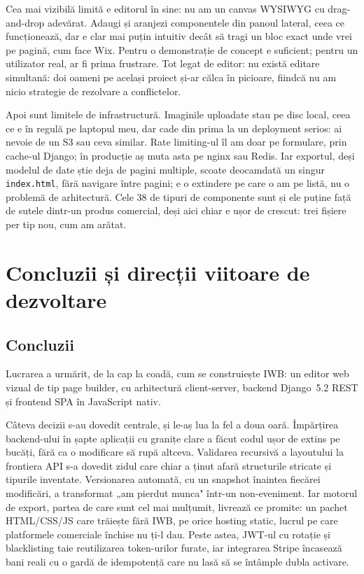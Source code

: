 \documentclass[12pt,a4paper]{report}
\begin{document}
Cea mai vizibilă limită e editorul în sine: nu am un canvas WYSIWYG cu drag-and-drop
adevărat. Adaugi și aranjezi componentele din panoul lateral, ceea ce funcționează, dar
e clar mai puțin intuitiv decât să tragi un bloc exact unde vrei pe pagină, cum face
Wix. Pentru o demonstrație de concept e suficient; pentru un utilizator real, ar fi
prima frustrare. Tot legat de editor: nu există editare simultană: doi oameni pe
același proiect și-ar călca în picioare, fiindcă nu am nicio strategie de rezolvare a
conflictelor.

Apoi sunt limitele de infrastructură. Imaginile uploadate stau pe disc local, ceea ce
e în regulă pe laptopul meu, dar cade din prima la un deployment serios: ai nevoie
de un S3 sau ceva similar. Rate limiting-ul îl am doar pe formulare, prin cache-ul
Django; în producție aș muta asta pe nginx sau Redis. Iar exportul, deși modelul de
date știe deja de pagini multiple, scoate deocamdată un singur \texttt{index.html}, fără
navigare între pagini; e o extindere pe care o am pe listă, nu o problemă de
arhitectură. Cele 38 de tipuri de componente sunt și ele puține față de sutele dintr-un
produs comercial, deși aici chiar e ușor de crescut: trei fișiere per tip nou, cum am
arătat.

\chapter{Concluzii și direcții viitoare de dezvoltare}

\section{Concluzii}

Lucrarea a urmărit, de la cap la coadă, cum se construiește IWB: un editor
web vizual de tip page builder, cu arhitectură client-server, backend Django~5.2 REST
și frontend SPA în JavaScript nativ.

Câteva decizii s-au dovedit centrale, și le-aș lua la fel a doua oară. Împărțirea
backend-ului în șapte aplicații cu granițe clare a făcut codul ușor de extins pe bucăți,
fără ca o modificare să rupă altceva. Validarea recursivă a layoutului la frontiera API
s-a dovedit zidul care chiar a ținut afară structurile stricate și tipurile inventate.
Versionarea automată, cu un snapshot înaintea fiecărei modificări, a transformat „am
pierdut munca" într-un non-eveniment. Iar motorul de export, partea de care sunt cel
mai mulțumit, livrează ce promite: un pachet HTML/CSS/JS care trăiește fără IWB,
pe orice hosting static, lucrul pe care platformele comerciale închise nu ți-l
dau. Peste astea, JWT-ul cu rotație și blacklisting taie reutilizarea token-urilor
furate, iar integrarea Stripe încasează bani reali cu o gardă de idempotență care nu
lasă să se întâmple dubla activare.
\end{document}
